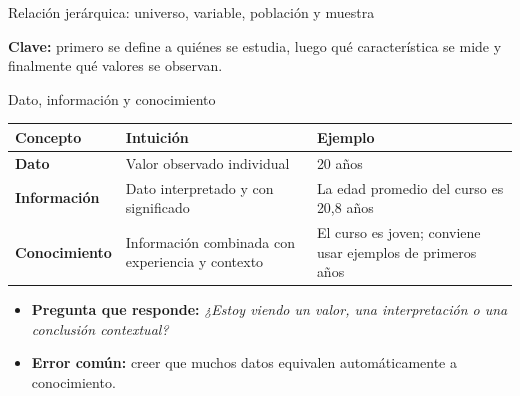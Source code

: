 \documentclass[aspectratio=169,11pt]{beamer}
\newcommand{\pregunta}[1]{\textbf{Pregunta que responde:} \emph{#1}}
\newcommand{\errorcomun}[1]{\textbf{Error común:} #1}
\begin{document}
\begin{frame}{Relación jerárquica: universo, variable, población y muestra}
\centering
{}
\vspace{0.5em}

\textbf{Clave:} primero se define a quiénes se estudia, luego qué característica se mide y finalmente qué valores se observan.
\end{frame}

\begin{frame}{Dato, información y conocimiento}
\begin{tabular}{>{\bfseries}p{}p{}p{}}
\toprule
Concepto & Intuición & Ejemplo \\
\midrule
Dato & Valor observado individual & 20 años \\
Información & Dato interpretado y con significado & La edad promedio del curso es 20,8 años \\
Conocimiento & Información combinada con experiencia y contexto & El curso es joven; conviene usar ejemplos de primeros años \\
\bottomrule
\end{tabular}
\vspace{0.6em}
\begin{itemize}
  \item \pregunta{¿Estoy viendo un valor, una interpretación o una conclusión contextual?}
  \item \errorcomun{creer que muchos datos equivalen automáticamente a conocimiento.}
\end{itemize}
\end{frame}
\end{document}
